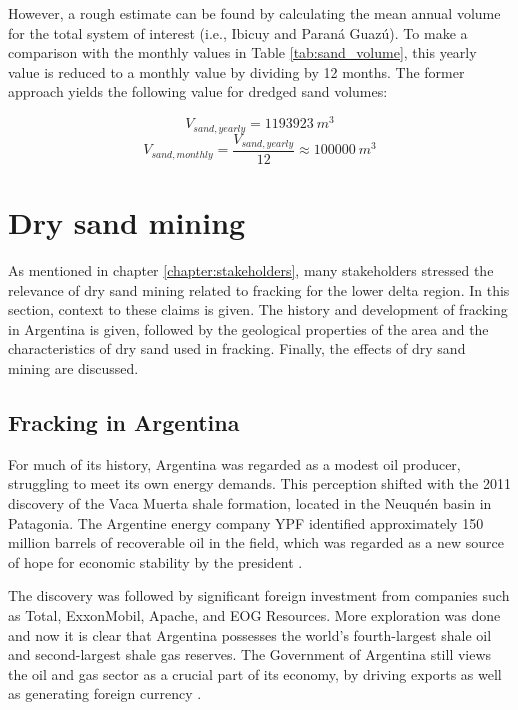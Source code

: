 However, a rough estimate can be found by calculating the mean annual volume for the total system of interest (i.e., Ibicuy and Paraná Guazú). To make a comparison with the monthly values in Table \ref{tab:sand_volume}, this yearly value is reduced to a monthly value by dividing by 12 months. The former approach yields the following value for dredged sand volumes:

\begin{equation}
    V_{sand,yearly} = 1193923 ~m^3
\end{equation}
\begin{equation}
    V_{sand,monthly} = \frac{V_{sand,yearly}}{12} \approx 100000 ~m^3 
\end{equation}

\section{Dry sand mining}
As mentioned in chapter \ref{chapter:stakeholders}, many stakeholders stressed the relevance of dry sand mining related to fracking for the lower delta region. In this section, context to these claims is given. The history and development of fracking in Argentina is given, followed by the geological properties of the area and the characteristics of dry sand used in fracking. Finally, the effects of dry sand mining are discussed.

\subsection{Fracking in Argentina}
For much of its history, Argentina was regarded as a modest oil producer, struggling to meet its own energy demands. This perception shifted with the 2011 discovery of the Vaca Muerta shale formation, located in the Neuquén basin in Patagonia. The Argentine energy company YPF identified approximately 150 million barrels of recoverable oil in the field, which was regarded as a new source of hope for economic stability by the president \autocite{kraussArgentinaHopesBig2011}.

The discovery was followed by significant foreign investment from companies such as Total, ExxonMobil, Apache, and EOG Resources. More exploration was done and now it is clear that Argentina possesses the world’s fourth-largest shale oil and second-largest shale gas reserves. The Government of Argentina still views the oil and gas sector as a crucial part of its economy, by driving exports as well as generating foreign currency \autocite{internationaltradeadministrationArgentinaCountryCommercial2025}.

